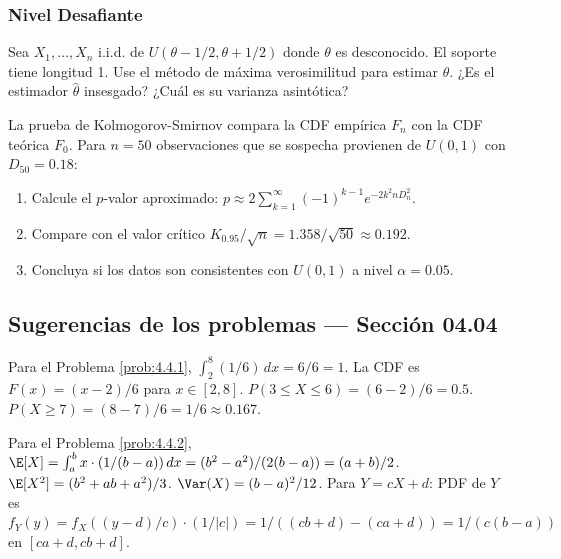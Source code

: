 \subsubsection*{Nivel Desafiante}

\begin{problema}
	\label{prob:4.4.9}
	Sea $X_{1}, \dots, X_{n}$ i.i.d. de $U(\theta - 1/2, \theta + 1/2)$ donde $\theta$ es desconocido. El soporte tiene longitud 1. Use el método de máxima verosimilitud para estimar $\theta$. ¿Es el estimador $\hat{\theta}$ insesgado? ¿Cuál es su varianza asintótica?
\end{problema}

\begin{problema}
	\label{prob:4.4.10}
	La prueba de Kolmogorov-Smirnov compara la CDF empírica $F_{n}$ con la CDF teórica $F_{0}$. Para $n = 50$ observaciones que se sospecha provienen de $U(0, 1)$ con $D_{50} = 0.18$:
	\begin{enumerate}
		\item Calcule el $p$-valor aproximado: $p \approx 2 \sum_{k=1}^{\infty}(-1)^{k-1} e^{-2k^{2}n D_{n}^{2}}$.
		\item Compare con el valor crítico $K_{0.95}/\sqrt{n} = 1.358/\sqrt{50} \approx 0.192$.
		\item Concluya si los datos son consistentes con $U(0, 1)$ a nivel $\alpha = 0.05$.
	\end{enumerate}
\end{problema}

\subsection*{Sugerencias de los problemas --- Sección 04.04}

\begin{sugerencia}
	\label{sug:4.4.1}
	Para el Problema \ref{prob:4.4.1}, $\int_{2}^{8} (1/6)\,dx = 6/6 = 1$. La CDF es $F(x) = (x-2)/6$ para $x \in [2, 8]$. $P(3 \le X \le 6) = (6-2)/6 = 0.5$. $P(X \ge 7) = (8-7)/6 = 1/6 \approx 0.167$.
\end{sugerencia}

\begin{sugerencia}
	\label{sug:4.4.2}
	Para el Problema \ref{prob:4.4.2}, $\E[X] = \int_{a}^{b} x \cdot (1/(b-a))\,dx = (b^{2} - a^{2})/(2(b-a)) = (a+b)/2$. $\E[X^{2}] = (b^{2} + ab + a^{2})/3$. $\Var(X) = (b-a)^{2}/12$. Para $Y = cX + d$: PDF de $Y$ es $f_{Y}(y) = f_{X}((y-d)/c) \cdot (1/|c|) = 1/((cb+d)-(ca+d)) = 1/(c(b-a))$ en $[ca+d, cb+d]$.
\end{sugerencia}


